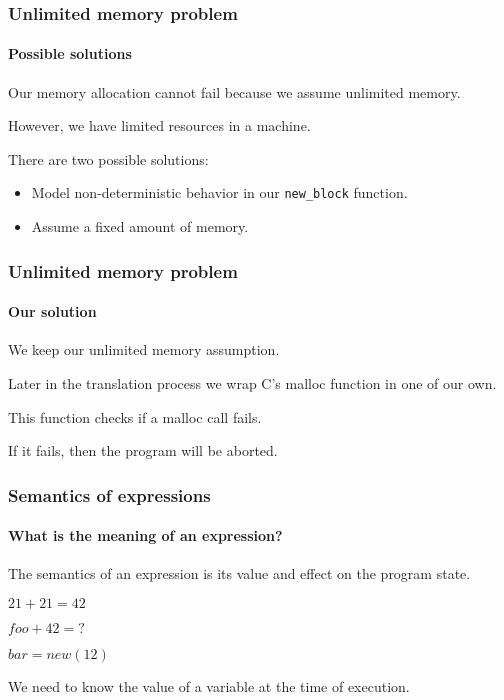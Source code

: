 \begin{frame}[fragile]
\frametitle{Unlimited memory problem}
\framesubtitle{Possible solutions}

Our memory allocation cannot fail because we assume unlimited memory.

\bigskip

However, we have limited resources in a machine.

There are two possible solutions:

\begin{itemize}
\item{Model non-deterministic behavior in our \verb|new_block| function.}
\item{Assume a fixed amount of memory.}
\end{itemize}


\end{frame}


\begin{frame}
\frametitle{Unlimited memory problem}
\framesubtitle{Our solution}

We keep our unlimited memory assumption.

\bigskip
Later in the translation process we wrap C's malloc function in one of our own.

\bigskip
This function checks if a malloc call fails.

\bigskip
If it fails, then the program will be aborted.


\end{frame}


\begin{frame}
\frametitle{Semantics of expressions}
\framesubtitle{What is the meaning of an expression?}

The semantics of an expression is its value and effect on the program state.

\pause
\begin{example}
$21 + 21 = 42$

\pause

$foo + 42 = ?$

\pause

$bar = new (12)$
\end{example}
\pause

We need to know the value of a variable at the time of execution.



\end{frame}


